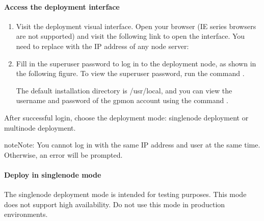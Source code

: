 \documentclass[letterpaper,10pt,english]{sphinxmanual}
\begin{document}
\paragraph{Access the deployment interface}
\label{\detokenize{deploy-guides/physical-deploy/visualized-deploy:access-the-deployment-interface}}\begin{enumerate}
%
\item {} 
\sphinxAtStartPar
Visit the deployment visual interface. Open your browser (IE series browsers are not supported) and visit the following link to open the interface. You need to replace  with the IP address of any node server:

\begin{sphinxVerbatim}[commandchars=\\\{\}]
\end{sphinxVerbatim}

\item {} 
\sphinxAtStartPar
Fill in the superuser password to log in to the deployment node, as shown in the following figure. To view the superuser password, run the command .

\sphinxAtStartPar
The default installation directory is /usr/local, and you can view the username and password of the gpmon account using the command .

\noindent{}

\end{enumerate}

\sphinxAtStartPar
After successful login, choose the deployment mode: single\sphinxhyphen{}node deployment or multi\sphinxhyphen{}node deployment.

\begin{sphinxadmonition}{note}{Note:}
\sphinxAtStartPar
You cannot log in with the same IP address and user at the same time. Otherwise, an error will be prompted.
\end{sphinxadmonition}


\paragraph{Deploy in single\sphinxhyphen{}node mode}
\label{\detokenize{deploy-guides/physical-deploy/visualized-deploy:deploy-in-single-node-mode}}
\sphinxAtStartPar
The single\sphinxhyphen{}node deployment mode is intended for testing purposes. This mode does not support high availability. Do not use this mode in production environments.
\end{document}
